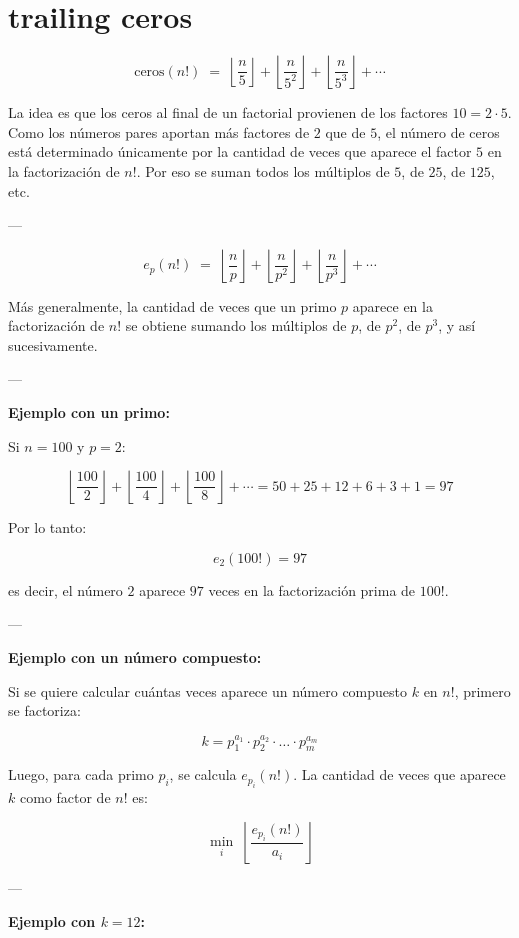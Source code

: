 \documentclass[12pt]{article}
\begin{document}
\section{trailing ceros}
\[
\text{ceros}(n!) \;=\; \left\lfloor \frac{n}{5} \right\rfloor + \left\lfloor \frac{n}{5^2} \right\rfloor + \left\lfloor \frac{n}{5^3} \right\rfloor + \cdots
\]

La idea es que los ceros al final de un factorial provienen de los factores $10 = 2 \cdot 5$.
Como los números pares aportan más factores de $2$ que de $5$, el número de ceros está
determinado únicamente por la cantidad de veces que aparece el factor $5$ en la factorización de $n!$.
Por eso se suman todos los múltiplos de $5$, de $25$, de $125$, etc.

---

\[
e_p(n!) \;=\; \left\lfloor \frac{n}{p} \right\rfloor + \left\lfloor \frac{n}{p^2} \right\rfloor + \left\lfloor \frac{n}{p^3} \right\rfloor + \cdots
\]

Más generalmente, la cantidad de veces que un primo $p$ aparece en la factorización de $n!$
se obtiene sumando los múltiplos de $p$, de $p^2$, de $p^3$, y así sucesivamente.

---

\textbf{Ejemplo con un primo:}

Si $n = 100$ y $p = 2$:

\[
\left\lfloor \frac{100}{2} \right\rfloor +
\left\lfloor \frac{100}{4} \right\rfloor +
\left\lfloor \frac{100}{8} \right\rfloor +
\cdots
= 50 + 25 + 12 + 6 + 3 + 1 = 97
\]

Por lo tanto:

\[
e_2(100!) = 97
\]

es decir, el número $2$ aparece $97$ veces en la factorización prima de $100!$.

---

\textbf{Ejemplo con un número compuesto:}

Si se quiere calcular cuántas veces aparece un número compuesto $k$ en $n!$, primero se factoriza:

\[
k = p_1^{a_1} \cdot p_2^{a_2} \cdot \ldots \cdot p_m^{a_m}
\]

Luego, para cada primo $p_i$, se calcula $e_{p_i}(n!)$.  
La cantidad de veces que aparece $k$ como factor de $n!$ es:

\[
\min_i \; \left\lfloor \frac{e_{p_i}(n!)}{a_i} \right\rfloor
\]

---

\textbf{Ejemplo con $k=12$:}
\end{document}
